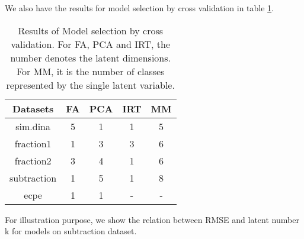 \documentclass[11pt]{article}
\begin{document}
We also have the results for model selection by cross validation in table \ref{tab:Model}.
\begin{table}[!h]
\begin{center}
\begin{tabular}{|c|c|c|c|c|}
\hline
Datasets & FA & PCA & IRT & MM\\
\hline
sim.dina & 5 & 1 & 1 & 5 \\
\hline
fraction1 & 1 & 3 & 3 & 6 \\
\hline
fraction2 & 3 & 4 & 1 & 6 \\
\hline
subtraction & 1 & 5 & 1 & 8 \\
\hline
ecpe & 1 & 1 & - & - \\
\hline
\end{tabular}
\end{center}
\caption{Results of Model selection by cross validation. For FA, PCA and IRT, the number denotes the latent dimensions. For MM, it is the number of classes represented by the single latent variable.}\label{tab:Model}
\end{table}

For illustration purpose, we show the relation between RMSE and latent number k for models on subtraction dataset.
%
%
%
	


\end{document}
